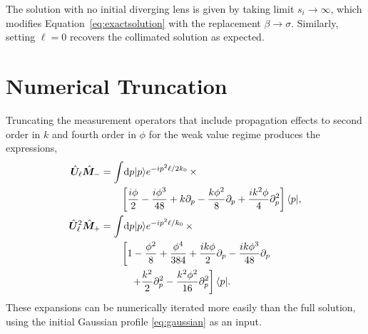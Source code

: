 \begin{appendices}
The solution with no initial diverging lens is given by taking limit $s_i \rightarrow \infty$, which modifies Equation~\eqref{eq:exactsolution} with the replacement $\beta \rightarrow \sigma$.  Similarly, setting $\ell = 0$ recovers the collimated solution as expected. 

\section{Numerical Truncation}\label{sec:truncation}
Truncating the measurement operators that include propagation effects to second order in $k$ and fourth order in $\phi$ for the weak value regime produces the expressions, 
\begin{subequations}\label{eq:approximateexpansions}
\begin{align}
 \hat{\bm U}_\ell\hat{\bm M}_- &= \int \! \mathrm{d}p\lvert p\rangle e^{-ip^2\ell/2k_0}\, \times \\
 &\qquad \left[\frac{i\phi}{2} -\frac{i\phi^3}{48} + k\partial_p - \frac{k\phi^2}{8}\partial_p + \frac{ik^2\phi}{4} \partial_p^2\right]\langle p \rvert, \nonumber \\
 \hat{\bm U}_\ell^2 \hat{\bm M}_+ &= \int \! \mathrm{d}p\lvert p\rangle e^{-ip^2\ell/k_0}\, \times \\
 &\qquad \left[1 - \frac{\phi^2}{8} + \frac{\phi^4}{384} + \frac{ik\phi}{2}\partial_p - \frac{ik\phi^3}{48}\partial_p \right.\nonumber \\
 &\qquad\quad\left. + \frac{k^2}{2}\partial_p^2 - \frac{k^2\phi^2}{16}\partial_p^2\right]\langle p \rvert . \nonumber
\end{align}
\end{subequations}
These expansions can be numerically iterated more easily than the full solution, using the initial Gaussian profile \eqref{eq:gaussian} as an input.  
\end{appendices}

